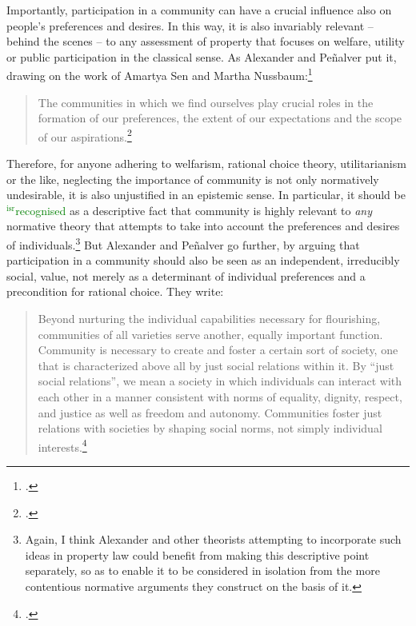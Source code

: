 \documentclass[12pt,a4paper]{book} %
\newcommand{\isr}[1]{\textcolor{green}{$^{\textrm{isr}}${#1}}}
\begin{document}
Importantly, participation in a community can have a crucial influence also on people's preferences and desires. In this way, it is also invariably relevant -- behind the scenes -- to any assessment of property that focuses on welfare, utility or public participation in the classical sense. As Alexander and Pe\~{n}alver put it, drawing on the work of Amartya Sen and Martha Nussbaum:\footcite{sen84,sen85,sen99,nussbaum00,nussbaum02}
\begin{quote}
The communities in which we find ourselves play crucial roles in the formation of our preferences, the extent of our expectations and the scope of our aspirations.\footcite[140]{alexander09}
\end{quote}
Therefore, for anyone adhering to welfarism, rational choice theory, utilitarianism or the like, neglecting the importance of community is not only normatively undesirable, it is also unjustified in an epistemic sense. In particular, it should be \isr{recognised} as a descriptive fact that community is highly relevant to {\it any} normative theory that attempts to take into account the preferences and desires of individuals.\footnote{Again, I think Alexander and other theorists attempting to incorporate such ideas in property law could benefit from making this descriptive point separately, so as to enable it to be considered in isolation from the more contentious normative arguments they construct on the basis of it.} But Alexander and Pe\~{n}alver go further, by arguing that participation in a community should also be seen as an independent, irreducibly social, value, not merely as a determinant of individual preferences and a precondition for rational choice. They write:

\begin{quote}
Beyond nurturing the individual capabilities necessary for flourishing, communities of all varieties serve another, equally important function. Community is necessary to create and foster a certain sort of society, one that is characterized above all by just social relations within it. By ``just social relations'', we mean a society in which individuals can interact with each other in a manner consistent with norms of equality, dignity, respect, and justice as well as freedom and autonomy. Communities foster just relations with societies by shaping social norms, not simply individual interests.\footcite[140]{alexander09}
\end{quote}
\end{document}
